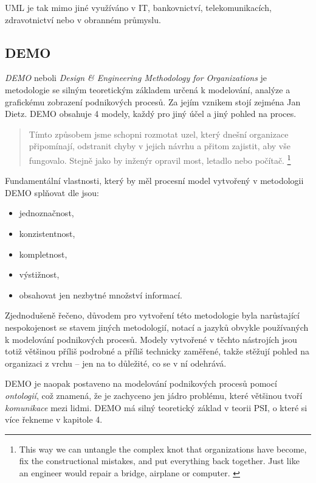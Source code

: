 UML je tak mimo jiné využíváno v IT, bankovnictví, telekomunikacích, zdravotnictví nebo v obranném průmyslu.

\subsection{DEMO}
\textit{DEMO} neboli \textit{Design \& Engineering Methodology for Organizations} je metodologie se silným teoretickým základem určená k modelování, analýze a grafickému zobrazení podnikových procesů. Za jejím vznikem stojí zejména Jan Dietz. DEMO obsahuje 4 modely, každý pro jiný účel a jiný pohled na proces.

\begin{quote}
Tímto způsobem jsme schopni rozmotat uzel,  který dnešní organizace připomínají, odstranit chyby v jejich návrhu a přitom zajistit, aby vše fungovalo. Stejně jako by inženýr opravil most, letadlo nebo počítač. \cite{DEMO_web}
\footnote{This way we can untangle the complex knot that organizations have become, fix the constructional mistakes, and put everything back together. Just like an engineer would repair a bridge, airplane or computer. \cite{DEMO_web}}
\end{quote}

Fundamentální vlastnosti, který by měl procesní model vytvořený v metodologii DEMO splňovat dle \cite{Dietz2006} jsou:

\begin{itemize}
\item jednoznačnost,
\item konzistentnost,
\item kompletnost,
\item výstižnost,
\item obsahovat jen nezbytné množství informací.
\end{itemize}

Zjednodušeně řečeno, důvodem pro vytvoření této metodologie byla narůstající nespokojenost se stavem jiných metodologií, notací a jazyků obvykle používaných k modelování podnikových procesů. 
Modely vytvořené v těchto nástrojích jsou totiž většinou příliš podrobné a příliš technicky zaměřené, takže stěžují pohled na organizaci z vrchu – jen na to důležité, co se v ní odehrává.

DEMO je naopak postaveno na modelování podnikových procesů pomocí \textit{ontologií}, což znamená, že je zachyceno jen jádro problému, které většinou tvoří \textit{komunikace} mezi lidmi. DEMO má silný teoretický základ v teorii PSI, o které si více řekneme v kapitole 4. %

